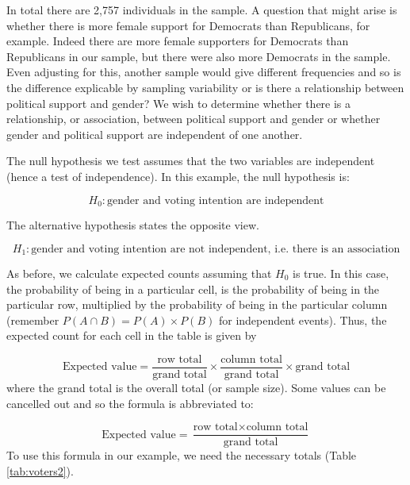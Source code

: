 \documentclass[
  oneside]{krantz}
\begin{document}
In total there are 2,757 individuals in the sample. A question that might arise is whether there is more female support for Democrats than Republicans, for example. Indeed there are more female supporters for Democrats than Republicans in our sample, but there were also more Democrats in the sample. Even adjusting for this, another sample would give different frequencies and so is the difference explicable by sampling variability or is there a relationship between political support and gender? We wish to determine whether there is a relationship, or association, between political support and gender or whether gender and political support are independent of one another.

The null hypothesis we test assumes that the two variables are independent (hence a test of independence). In this example, the null hypothesis is:

\[H_0: \textrm{gender and voting intention are independent}\]

The alternative hypothesis states the opposite view.

\[H_1: \textrm{gender and voting intention are not independent, i.e. there is an association}\]

As before, we calculate expected counts assuming that \(H_0\) is true. In this case, the probability of being in a particular cell, is the probability of being in the particular row, multiplied by the probability of being in the particular column (remember \(P(A \cap B) = P(A) \times P(B)\) for independent events). Thus, the expected count for each cell in the table is given by

\[\textrm{Expected value} =  \frac{\textrm{row total}}{\textrm{grand total}} \times \frac{\textrm{column total}}{\textrm{grand total}} \times \textrm{grand total}\]
where the grand total is the overall total (or sample size). Some values can be cancelled out and so the formula is abbreviated to:

\[\textrm{Expected value} =  \frac{\textrm{row total} \times \textrm{column total}}{\textrm{grand total}} \]
To use this formula in our example, we need the necessary totals (Table \ref{tab:voters2}).
\end{document}
